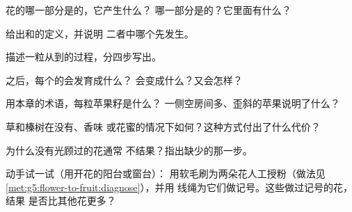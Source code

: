 \begin{exercise}[$\star$]\label{exo:g5:flower-to-fruit:1}
花的哪一部分是的，它产生什么？
哪一部分是的？它里面有什么？
\end{exercise}

\begin{exercise}[$\star$]\label{exo:g5:flower-to-fruit:2}
给出和的定义，并说明
二者中哪个先发生。
\end{exercise}

\begin{exercise}[$\star$]\label{exo:g5:flower-to-fruit:3}
描述一粒从到的过程，分四步写出。
\end{exercise}

\begin{exercise}[$\star$]\label{exo:g5:flower-to-fruit:4}
之后，每个的会发育成什么？
会变成什么？又会怎样？
\end{exercise}

\begin{exercise}[$\star$]\label{exo:g5:flower-to-fruit:5}
用本章的术语，每粒苹果籽是什么？
一侧空房间多、歪斜的苹果说明了什么？
\end{exercise}

\begin{exercise}[$\star$]\label{exo:g5:flower-to-fruit:6}
草和榛树在没有、香味
或花蜜的情况下如何？这种方式付出了什么代价？
\end{exercise}

\begin{exercise}[$\star$]\label{exo:g5:flower-to-fruit:7}
为什么没有光顾过的花通常
不结果？指出缺少的那一步。
\end{exercise}

\begin{exercise}[$\star$]\label{exo:g5:flower-to-fruit:8}
动手试一试（用开花的阳台或窗台）：
用软毛刷为两朵花人工授粉（做法见
\cref{met:g5:flower-to-fruit:diagnose}），并用
线绳为它们做记号。这些做过记号的花，结果
是否比其他花更多？
\end{exercise}

